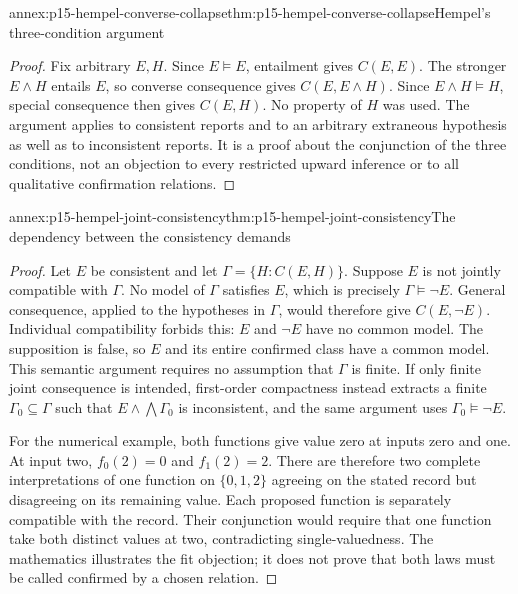 \begin{annexitem}{annex:p15-hempel-converse-collapse}{thm:p15-hempel-converse-collapse}{Hempel's three-condition argument}
\begin{proof}
Fix arbitrary $E,H$. Since $E\models E$, entailment gives $C(E,E)$.
The stronger $E\land H$ entails $E$, so converse consequence gives
$C(E,E\land H)$. Since $E\land H\models H$, special consequence
then gives $C(E,H)$. No property of $H$ was used. The argument applies
to consistent reports and to an arbitrary extraneous hypothesis as
well as to inconsistent reports. It is a proof about the conjunction
of the three conditions, not an objection to every restricted upward
inference or to all qualitative confirmation relations.
\end{proof}
\end{annexitem}

\begin{annexitem}{annex:p15-hempel-joint-consistency}{thm:p15-hempel-joint-consistency}{The dependency between the consistency demands}
\begin{proof}
Let $E$ be consistent and let $\Gamma=\{H:C(E,H)\}$.
Suppose $E$ is not jointly compatible with $\Gamma$. No model of
$\Gamma$ satisfies $E$, which is precisely $\Gamma\models\neg E$.
General consequence, applied to the hypotheses in $\Gamma$, would
therefore give $C(E,\neg E)$. Individual compatibility forbids this:
$E$ and $\neg E$ have no common model. The supposition is false,
so $E$ and its entire confirmed class have a common model. This
semantic argument requires no assumption that $\Gamma$ is finite.
If only finite joint consequence is intended, first-order compactness
instead extracts a finite $\Gamma_0\subseteq\Gamma$ such that
$E\land\bigwedge\Gamma_0$ is inconsistent, and the same argument
uses $\Gamma_0\models\neg E$.

For the numerical example, both functions give value zero at inputs
zero and one. At input two, $f_0(2)=0$ and $f_1(2)=2$. There are
therefore two complete interpretations of one function on
$\{0,1,2\}$ agreeing on the stated record but disagreeing on its
remaining value. Each proposed function is separately compatible
with the record. Their conjunction would require that one function
take both distinct values at two, contradicting single-valuedness.
The mathematics illustrates the fit objection; it does not prove
that both laws must be called confirmed by a chosen relation.
\end{proof}
\end{annexitem}

